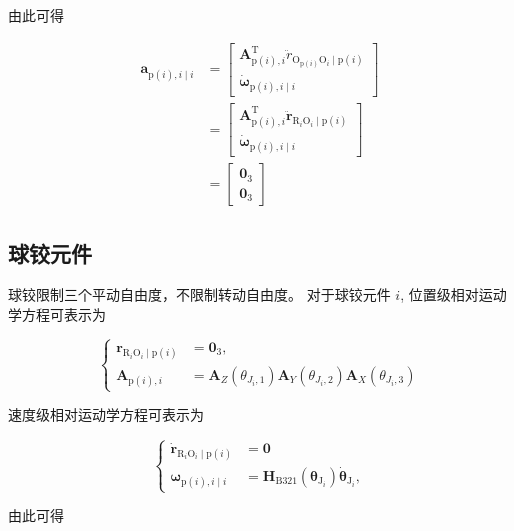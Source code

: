 由此可得

\[
\begin{aligned}
\boldsymbol{a}_{\mathrm{p}(i), i \mid i} & =\left[\begin{array}{c}
\boldsymbol{A}_{\mathrm{p}(i), i}^{\mathrm{T}} \ddot{r}_{\mathrm{O}_{\mathrm{p}(i)} \mathrm{O}_{i} \mid \mathrm{p}(i)} \\
\dot{\boldsymbol{\omega}}_{\mathrm{p}(i), i \mid i}
\end{array}\right] \\
& =\left[\begin{array}{c}
\boldsymbol{A}_{\mathrm{p}(i), i}^{\mathrm{T}} \ddot{\boldsymbol{r}}_{\mathrm{R}_{i} \mathrm{O}_{i} \mid \mathrm{p}(i)} \\
\dot{\boldsymbol{\omega}}_{\mathrm{p}(i), i \mid i}
\end{array}\right] \\
& =\left[\begin{array}{c}
 \boldsymbol{0}_{3}\\\mathbf{0}_{3}
\end{array}\right] 
\end{aligned}
\]
\subsection{球铰元件}
球铰限制三个平动自由度，不限制转动自由度。 对于球铰元件 $i$, 位置级相对运动学方程可表示为

\[
\left\{\begin{aligned}
\boldsymbol{r}_{\mathrm{R}_{i} \mathrm{O}_{i} \mid \mathrm{p}(i)} & =\boldsymbol{0}_{3}, \\
\boldsymbol{A}_{\mathrm{p}(i), i} & =\boldsymbol{A}_{Z} (\theta_{J_{i},1})\boldsymbol{A}_{Y} (\theta_{J_{i},2})\boldsymbol{A}_{X} (\theta_{J_{i},3})
\end{aligned}\right.
\]

速度级相对运动学方程可表示为

\[
\left\{\begin{aligned}
\dot{\boldsymbol{r}}_{\mathrm{R}_{i} \mathrm{O}_{i}\mid \mathrm{p}(i)}  & =\mathbf{0} \\
\boldsymbol{\omega}_{\mathrm{p}(i), i \mid i} & =\boldsymbol{H}_{\mathrm{B} 321}\left(\boldsymbol{\theta}_{\mathrm{J}_{i}}\right) \dot{\boldsymbol{\theta}}_{\mathrm{J}_{i}},
\end{aligned}\right.
\]

由此可得

